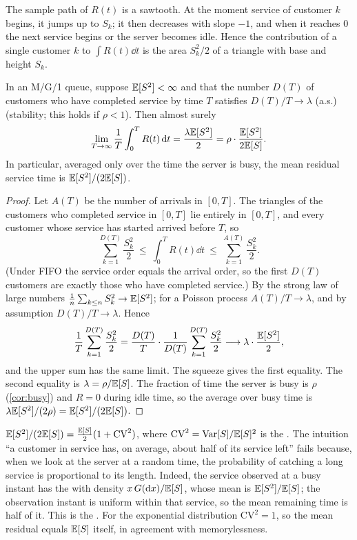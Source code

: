 The sample path of $R(t)$ is a sawtooth. At the moment service of customer $k$
begins, it jumps up to $S_k$; it then decreases with slope $-1$, and when it
reaches 0 the next service begins or the server becomes idle. Hence the
contribution of a single customer $k$ to $\int R(t)\dd t$ is the area $S_k^2/2$
of a triangle with base and height $S_k$.

\begin{lemma}\label{lem:residual}
In an M/G/1 queue, suppose $\mathbb{E}[S^2]<\infty$ and that the number $D(T)$ of
customers who have completed service by time $T$ satisfies $D(T)/T\to\lambda$
(a.s.) (stability; this holds if $\rho<1$). Then almost surely
\[
  \lim_{T\to\infty}\frac1T\int_0^T R(t)\,\mathrm{d} t=\frac{\lambda\mathbb{E}[S^2]}{2}
  =\rho\cdot\frac{\mathbb{E}[S^2]}{2\mathbb{E}[S]}.
\]
In particular, averaged only over the time the server is busy, the mean residual
service time is $\mathbb{E}[S^2]/(2\mathbb{E}[S])$.
\end{lemma}

\begin{proof}
Let $A(T)$ be the number of arrivals in $[0,T]$. The triangles of the customers
who completed service in $[0,T]$ lie entirely in $[0,T]$, and every customer
whose service has started arrived before $T$, so
\[
  \sum_{k=1}^{D(T)}\frac{S_k^2}{2}\ \le\ \int_0^T R(t)\dd t\ \le\ \sum_{k=1}^{A(T)}\frac{S_k^2}{2}.
\]
(Under FIFO the service order equals the arrival order, so the first $D(T)$
customers are exactly those who have completed service.) By the strong law of
large numbers $\frac1n\sum_{k\le n}S_k^2\to\mathbb{E}[S^2]$; for a Poisson process
$A(T)/T\to\lambda$, and by assumption $D(T)/T\to\lambda$. Hence
\[
  \frac1T\sum_{k=1}^{D(T)}\frac{S_k^2}{2}
  =\frac{D(T)}{T}\cdot\frac{1}{D(T)}\sum_{k=1}^{D(T)}\frac{S_k^2}{2}
  \longrightarrow\lambda\cdot\frac{\mathbb{E}[S^2]}{2},
\]
and the upper sum has the same limit. The squeeze gives the first equality. The
second equality is $\lambda=\rho/\mathbb{E}[S]$. The fraction of time the server is busy
is $\rho$ (\cref{cor:busy}) and $R=0$ during idle time, so the average over busy
time is $\lambda\mathbb{E}[S^2]/(2\rho)=\mathbb{E}[S^2]/(2\mathbb{E}[S])$.
\end{proof}

\begin{remark}\label{L3:rem:inspection}
$\mathbb{E}[S^2]/(2\mathbb{E}[S])=\frac{\mathbb{E}[S]}{2}(1+\mathrm{CV}^2)$, where
$\mathrm{CV}^2=\operatorname{Var}[S]/\mathbb{E}[S]^2$ is the .
The intuition ``a customer in service has, on average, about half of its service
left'' fails because, when we look at the server at a random time, the
probability of catching a long service is proportional to its length. Indeed,
the service observed at a busy instant has the  with density $x\,G(\mathrm{d}x)/\mathbb{E}[S]$, whose mean is
$\mathbb{E}[S^2]/\mathbb{E}[S]$; the observation instant is uniform within that service, so the
mean remaining time is half of it. This is the . For the
exponential distribution $\mathrm{CV}^2=1$, so the mean residual equals $\mathbb{E}[S]$
itself, in agreement with memorylessness.
\end{remark}

